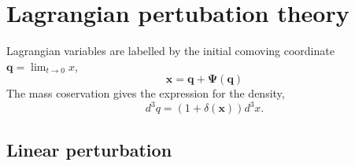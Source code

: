 \documentclass[a4paper]{article}
\begin{document}
\section{Lagrangian pertubation theory}
Lagrangian variables are labelled by the initial comoving coordinate $\bm{q} = \lim_{t \rightarrow 0} x$,
\begin{equation}
  \bm{x} = \bm{q} + \bm{\Psi}(\bm{q})
\end{equation}
The mass coservation gives the expression for the density,
\begin{equation}
  d^3 q = (1 + \delta(\bm{x})) d^3 x.
\end{equation}

\subsection{Linear perturbation}
\end{document}

